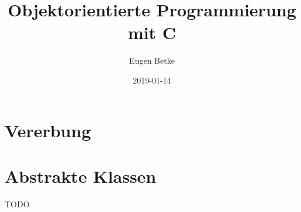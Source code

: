 \documentclass[a4paper]{article}
\title{Objektorientierte Programmierung mit C}
\author{Eugen Betke}
\date{2019-01-14}
\begin{document}
\maketitle

\tableofcontents



\section{Vererbung}







\section{Abstrakte Klassen}

TODO











\end{document}
